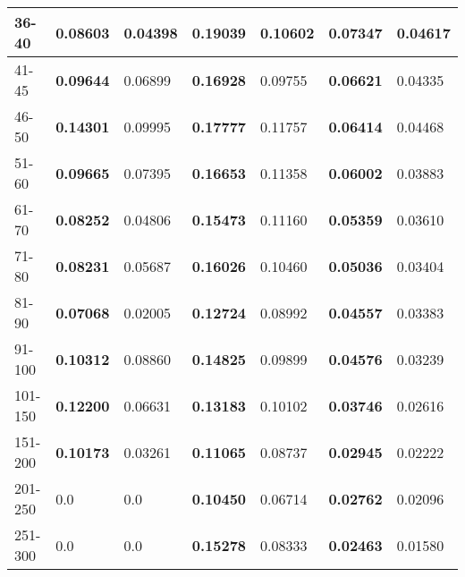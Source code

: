 \begin{table*}[h!]
\begin{tabular}{|l|l|l||l|l||l|l|}
        36-40     & \textbf{0.08603}                        & 0.04398                        & \textbf{0.19039}                 & 0.10602          & \textbf{0.07347} & 0.04617          \\ \hline
        41-45     & \textbf{0.09644}                        & 0.06899                        & \textbf{0.16928}                 & 0.09755          & \textbf{0.06621} & 0.04335          \\ \hline
        46-50     & \textbf{0.14301}                        & 0.09995                        & \textbf{0.17777}                 & 0.11757          & \textbf{0.06414} & 0.04468          \\ \hline
        51-60     & \textbf{0.09665}                        & 0.07395                        & \textbf{0.16653}                 & 0.11358          & \textbf{0.06002} & 0.03883          \\ \hline
        61-70     & \textbf{0.08252}                        & 0.04806                        & \textbf{0.15473}                 & 0.11160          & \textbf{0.05359} & 0.03610          \\ \hline
        71-80     & \textbf{0.08231}                        & 0.05687                        & \textbf{0.16026}                 & 0.10460          & \textbf{0.05036} & 0.03404          \\ \hline
        81-90     & \textbf{0.07068}                        & 0.02005                        & \textbf{0.12724}                 & 0.08992          & \textbf{0.04557} & 0.03383          \\ \hline
        91-100    & \textbf{0.10312}                        & 0.08860                        & \textbf{0.14825}                 & 0.09899          & \textbf{0.04576} & 0.03239          \\ \hline
        101-150   & \textbf{0.12200}                        & 0.06631                        & \textbf{0.13183}                 & 0.10102          & \textbf{0.03746} & 0.02616          \\ \hline
        151-200   & \textbf{0.10173}                        & 0.03261                        & \textbf{0.11065}                 & 0.08737          & \textbf{0.02945} & 0.02222          \\ \hline
        201-250   & 0.0                                     & 0.0                            & \textbf{0.10450}                 & 0.06714          & \textbf{0.02762} & 0.02096          \\ \hline
        251-300   & 0.0                                     & 0.0                            & \textbf{0.15278}                 & 0.08333          & \textbf{0.02463} & 0.01580          \\ \hline

\end{tabular}
\end{table*}
